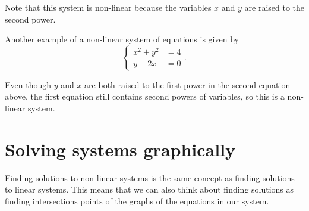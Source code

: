 \documentclass[nooutcomes]{ximera}
\begin{document}
Note that this system is non-linear because the variables $x$ and $y$ are raised to the second power. 

Another example of a non-linear system of equations is given by 
$$
\begin{cases}
x^2 + y^2 & =  4 \\
y - 2x & = 0
\end{cases}.
$$

Even though $y$ and $x$ are both raised to the first power in the second equation above, the first equation still contains second powers of variables, so this is a non-linear system. 

\section{Solving systems graphically}
Finding solutions to non-linear systems is the same concept as finding solutions to linear systems. This means that we can also think about finding solutions as finding intersections points of the graphs of the equations in our system.
\end{document}
